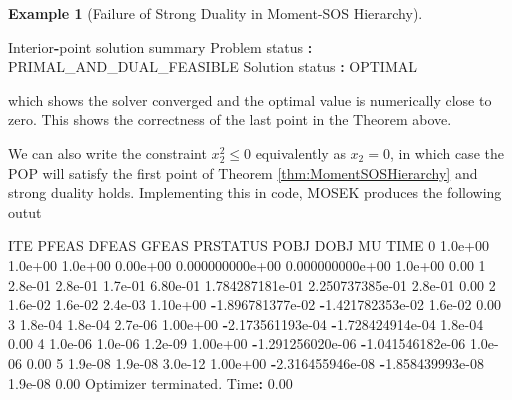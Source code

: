 \documentclass[
]{book}
\newenvironment{Shaded}{\begin{snugshade}}{\end{snugshade}}
\newcommand{\FloatTok}[1]{\textcolor[rgb]{0.00,0.00,0.81}{#1}}
\newcommand{\NormalTok}[1]{#1}
\newcommand{\OperatorTok}[1]{\textcolor[rgb]{0.81,0.36,0.00}{\textbf{#1}}}
\newcommand{\VariableTok}[1]{\textcolor[rgb]{0.00,0.00,0.00}{#1}}
\theoremstyle{definition}
\theoremstyle{definition}
\newtheorem{example}{Example}[chapter]
\theoremstyle{definition}
\theoremstyle{definition}
\theoremstyle{remark}
\begin{document}
\begin{example}[Failure of Strong Duality in Moment-SOS Hierarchy]
\begin{Shaded}
\begin{Highlighting}[]
\VariableTok{Interior}\OperatorTok{{-}}\VariableTok{point} \VariableTok{solution} \VariableTok{summary}
  \VariableTok{Problem} \VariableTok{status}  \OperatorTok{:} \VariableTok{PRIMAL\_AND\_DUAL\_FEASIBLE}
  \VariableTok{Solution} \VariableTok{status} \OperatorTok{:} \VariableTok{OPTIMAL}
\end{Highlighting}
\end{Shaded}

which shows the solver converged and the optimal value is numerically close to zero. This shows the correctness of the last point in the Theorem above.

We can also write the constraint \(x_2^2 \leq 0\) equivalently as \(x_2 = 0\), in which case the POP will satisfy the first point of Theorem \ref{thm:MomentSOSHierarchy} and strong duality holds. Implementing this in code, MOSEK produces the following outut

\begin{Shaded}
\begin{Highlighting}[]
\VariableTok{ITE} \VariableTok{PFEAS}    \VariableTok{DFEAS}    \VariableTok{GFEAS}    \VariableTok{PRSTATUS}   \VariableTok{POBJ}              \VariableTok{DOBJ}              \VariableTok{MU}       \VariableTok{TIME}  
\FloatTok{0}   \FloatTok{1.0e+00}  \FloatTok{1.0e+00}  \FloatTok{1.0e+00}  \FloatTok{0.00e+00}   \FloatTok{0.000000000e+00}   \FloatTok{0.000000000e+00}   \FloatTok{1.0e+00}  \FloatTok{0.00}  
\FloatTok{1}   \FloatTok{2.8e{-}01}  \FloatTok{2.8e{-}01}  \FloatTok{1.7e{-}01}  \FloatTok{6.80e{-}01}   \FloatTok{1.784287181e{-}01}   \FloatTok{2.250737385e{-}01}   \FloatTok{2.8e{-}01}  \FloatTok{0.00}  
\FloatTok{2}   \FloatTok{1.6e{-}02}  \FloatTok{1.6e{-}02}  \FloatTok{2.4e{-}03}  \FloatTok{1.10e+00}   \OperatorTok{{-}}\FloatTok{1.896781377e{-}02}  \OperatorTok{{-}}\FloatTok{1.421782353e{-}02}  \FloatTok{1.6e{-}02}  \FloatTok{0.00}  
\FloatTok{3}   \FloatTok{1.8e{-}04}  \FloatTok{1.8e{-}04}  \FloatTok{2.7e{-}06}  \FloatTok{1.00e+00}   \OperatorTok{{-}}\FloatTok{2.173561193e{-}04}  \OperatorTok{{-}}\FloatTok{1.728424914e{-}04}  \FloatTok{1.8e{-}04}  \FloatTok{0.00}  
\FloatTok{4}   \FloatTok{1.0e{-}06}  \FloatTok{1.0e{-}06}  \FloatTok{1.2e{-}09}  \FloatTok{1.00e+00}   \OperatorTok{{-}}\FloatTok{1.291256020e{-}06}  \OperatorTok{{-}}\FloatTok{1.041546182e{-}06}  \FloatTok{1.0e{-}06}  \FloatTok{0.00}  
\FloatTok{5}   \FloatTok{1.9e{-}08}  \FloatTok{1.9e{-}08}  \FloatTok{3.0e{-}12}  \FloatTok{1.00e+00}   \OperatorTok{{-}}\FloatTok{2.316455946e{-}08}  \OperatorTok{{-}}\FloatTok{1.858439993e{-}08}  \FloatTok{1.9e{-}08}  \FloatTok{0.00}  
\VariableTok{Optimizer} \VariableTok{terminated}\NormalTok{. }\VariableTok{Time}\OperatorTok{:} \FloatTok{0.00}    



\end{Highlighting}
\end{Shaded}
\end{example}
\end{document}
